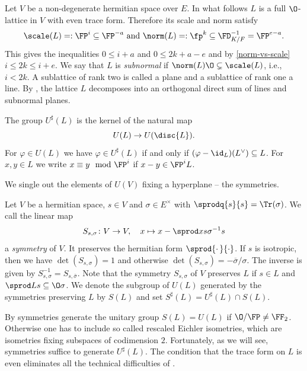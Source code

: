 Let $V$ be a non-degenerate hermitian space over $E$.
In what follows $L$ is a full $\O$-lattice in $V$ with even trace form.
Therefore its scale and norm satisfy
\[\scale(L)=:\FP^i\subseteq \FP^{-a}\text{ and }\norm(L)=:\fp^k\subseteq \FD_{K/F}^{-1} = \FP^{e-a}.\]
This gives the inequalities $0 \leq i+a$ and $0 \leq 2k+a-e$ and by \cref{norm-vs-scale} $i \leq 2k \leq i+e$.
We say that $L$ is \emph{subnormal} if $\norm(L)\O\subsetneq \scale(L)$, i.e., $i<2k$. A sublattice of rank two is called a plane and a sublattice of rank one a line.
By \cite[Propositions 4.3, 4.4]{Jacobowitz1962}, the lattice $L$ decomposes into an orthogonal direct sum of lines and subnormal planes.

The group $U^\sharp(L)$ is the kernel of the natural map
\[U(L) \rightarrow U(\disc{L}).\]
For $\varphi \in U(L)$ we have $\varphi \in U^\sharp(L)$ if and only if $(\varphi - \id_L)(L^\vee) \subseteq L$.
For $x,y \in L$ we write $x \equiv y \mod \FP^i$ if $x-y \in \FP^i L$.

We single out the elements of $U(V)$ fixing a hyperplane -- the symmetries.
\begin{definition}
  Let $V$ be a hermitian space, $s \in V$ and $\sigma \in E^\times$ with $\sprodq{s}{s}=\Tr(\sigma)$. We call the linear map
  \[S_{s,\sigma} \colon V \to V, \quad x \mapsto x -\sprod x s \sigma^{-1}s\]
  a \emph{symmetry} of $V$. It preserves the hermitian form $\sprod{\cdot\,}{\cdot}$.
  If $s$ is isotropic, then we have $\det(S_{s, \sigma}) = 1$ and
  otherwise $\det(S_{s,\sigma})=-\overline\sigma/\sigma$.
  The inverse is given by $S_{s,\sigma}^{-1}=S_{s,\bar \sigma}$.
  Note that the symmetry $S_{s, \sigma}$ of $V$ preserves $L$
  if $s \in L$ and $\sprod L s \subseteq \O \sigma$.
  We denote the subgroup of $U(L)$ generated by the symmetries preserving $L$ by $S(L)$ and set $S^\sharp(L) = U^\sharp(L) \cap S(L)$.
 \end{definition}

By \cite{brandhorsthofmann2021} symmetries generate the unitary group $S(L)=U(L)$ if $\O/\FP \neq \FF_2$. Otherwise one has to include so called rescaled Eichler isometries, which are isometries fixing subspaces of codimension $2$.
Fortunately, as we will see, symmetries suffice to generate $U^\sharp(L)$. The condition that the trace form on $L$ is even eliminates all the technical difficulties of \cite{brandhorsthofmann2021}.

